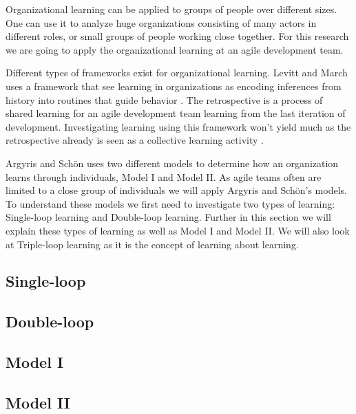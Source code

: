 Organizational learning can be applied to groups of people over different sizes. One can use it to analyze huge organizations consisting of many actors in different roles, or small groups of people working close together. For this research we are going to apply the organizational learning at an agile development team. 

Different types of frameworks exist for organizational learning. Levitt and March uses a framework that see learning in organizations as encoding inferences from history into routines that guide behavior \cite{Levitt1988}. The retrospective is a process of shared learning for an agile development team learning from the last iteration of development. Investigating learning using this framework won't yield much as the retrospective already is seen as a collective learning activity \cite{Dingsoyr2004}. 

Argyris and Schön \cite{Argyris1996} uses two different models to determine how an organization learns through individuals, Model I and Model II. As agile teams often are limited to a close group of individuals we will apply Argyris and Schön's models. To understand these models we first need to investigate two types of learning: Single-loop learning and Double-loop learning. Further in this section we will explain these types of learning as well as Model I and Model II. We will also look at Triple-loop learning as it is the concept of learning about learning. 

\subsection{Single-loop}

\subsection{Double-loop} %
\label{sub:double_loop}

\subsection{Model I} %
\label{sub:model_i}

\subsection{Model II} %
\label{sub:organizational_learning_ii}

